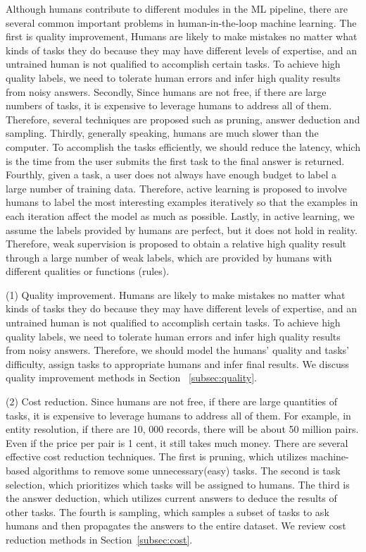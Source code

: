 Although  humans contribute to different modules in the ML pipeline, there are several common important problems in human-in-the-loop machine learning. The first is quality improvement, Humans are likely to make mistakes no matter what kinds of tasks they do because they may have different levels of expertise, and an untrained human is not qualified to accomplish certain tasks. To achieve high quality labels, we need to tolerate human errors and infer high quality results from noisy answers. Secondly, Since humans are not free, if there are large numbers of tasks, it is expensive to leverage humans to address all of them. Therefore, several techniques are proposed such as pruning, answer deduction and sampling. Thirdly, generally speaking, humans are much slower than the computer. To accomplish the tasks efficiently, we should reduce the latency, which is the time from the user submits the first task to the final answer is returned.  Fourthly, given a task, a user does not always have enough budget to label a large number of training data. Therefore, 
active learning is proposed to  involve humans to label the most interesting examples iteratively so that the examples in each iteration affect the model as much as possible.  Lastly, in active learning, we assume the labels provided by humans are perfect, but it does not hold in reality. Therefore, weak supervision is proposed to obtain a relative high quality result through a large number of weak labels, which are provided by humans with different qualities or functions (rules).


\iffalse
(1) Quality improvement. Humans are likely to make mistakes no matter what kinds of tasks they do because they may have different levels of expertise, and an untrained human is not qualified to accomplish certain tasks. To achieve high quality labels, we need to tolerate human errors and infer high quality results from noisy answers. Therefore, we should model the humans' quality and tasks' difficulty, assign  tasks to appropriate humans and infer final results. We discuss quality improvement methods in Section ~\ref{subsec:quality}.


(2) Cost reduction.  Since humans are not free, if there are large quantities of tasks, it is expensive to leverage humans to address all of them. For example, in entity resolution, if there are 10, 000 records, there will be about 50 million pairs. Even if the price per pair is 1 cent, it still takes much money. There are several effective cost reduction techniques. The first is pruning, which utilizes machine-based algorithms to remove some unnecessary(easy) tasks. The second is task selection, which prioritizes which tasks will be assigned to humans. The third is the answer deduction, which utilizes current answers to deduce the results of other tasks.
The fourth is sampling, which samples a subset of tasks to ask humans and then propagates the answers to the entire dataset.  We review cost reduction methods in Section~\ref{subsec:cost}.


